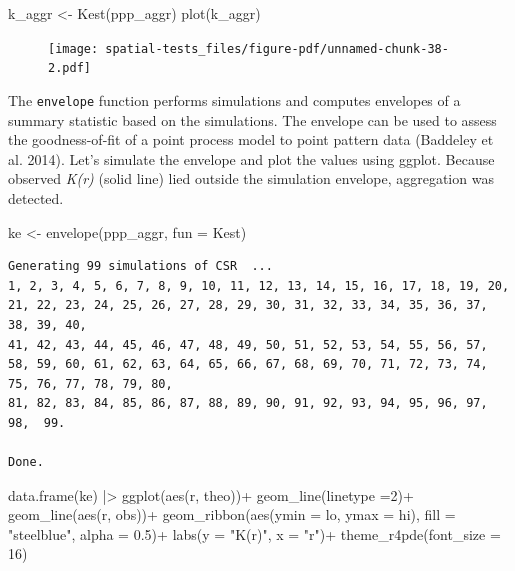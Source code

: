 \documentclass[
  letterpaper,
]{book}
\newenvironment{Shaded}{\begin{snugshade}}{\end{snugshade}}
\newcommand{\AttributeTok}[1]{\textcolor[rgb]{0.40,0.45,0.13}{#1}}
\newcommand{\DecValTok}[1]{\textcolor[rgb]{0.68,0.00,0.00}{#1}}
\newcommand{\FloatTok}[1]{\textcolor[rgb]{0.68,0.00,0.00}{#1}}
\newcommand{\FunctionTok}[1]{\textcolor[rgb]{0.28,0.35,0.67}{#1}}
\newcommand{\NormalTok}[1]{\textcolor[rgb]{0.00,0.23,0.31}{#1}}
\newcommand{\OtherTok}[1]{\textcolor[rgb]{0.00,0.23,0.31}{#1}}
\newcommand{\SpecialCharTok}[1]{\textcolor[rgb]{0.37,0.37,0.37}{#1}}
\newcommand{\StringTok}[1]{\textcolor[rgb]{0.13,0.47,0.30}{#1}}
\begin{document}
\begin{Shaded}
\begin{Highlighting}[]
\NormalTok{k\_aggr }\OtherTok{\textless{}{-}} \FunctionTok{Kest}\NormalTok{(ppp\_aggr)}
\FunctionTok{plot}\NormalTok{(k\_aggr)}
\end{Highlighting}
\end{Shaded}

\begin{figure}[H]

\texttt{[image: spatial-tests\_files/figure-pdf/unnamed-chunk-38-2.pdf]} \hfill{}

\end{figure}

The \texttt{envelope} function performs simulations and computes
envelopes of a summary statistic based on the simulations. The envelope
can be used to assess the goodness-of-fit of a point process model to
point pattern data (Baddeley et al. 2014). Let's simulate the envelope
and plot the values using ggplot. Because observed \emph{K(r)} (solid
line) lied outside the simulation envelope, aggregation was detected.

\begin{Shaded}
\begin{Highlighting}[]
\NormalTok{ke }\OtherTok{\textless{}{-}} \FunctionTok{envelope}\NormalTok{(ppp\_aggr, }\AttributeTok{fun =}\NormalTok{ Kest)}
\end{Highlighting}
\end{Shaded}

\begin{verbatim}
Generating 99 simulations of CSR  ...
1, 2, 3, 4, 5, 6, 7, 8, 9, 10, 11, 12, 13, 14, 15, 16, 17, 18, 19, 20, 21, 22, 23, 24, 25, 26, 27, 28, 29, 30, 31, 32, 33, 34, 35, 36, 37, 38, 39, 40,
41, 42, 43, 44, 45, 46, 47, 48, 49, 50, 51, 52, 53, 54, 55, 56, 57, 58, 59, 60, 61, 62, 63, 64, 65, 66, 67, 68, 69, 70, 71, 72, 73, 74, 75, 76, 77, 78, 79, 80,
81, 82, 83, 84, 85, 86, 87, 88, 89, 90, 91, 92, 93, 94, 95, 96, 97, 98,  99.

Done.
\end{verbatim}

\begin{Shaded}
\begin{Highlighting}[]
\FunctionTok{data.frame}\NormalTok{(ke) }\SpecialCharTok{|\textgreater{}} 
  \FunctionTok{ggplot}\NormalTok{(}\FunctionTok{aes}\NormalTok{(r, theo))}\SpecialCharTok{+}
  \FunctionTok{geom\_line}\NormalTok{(}\AttributeTok{linetype =}\DecValTok{2}\NormalTok{)}\SpecialCharTok{+}
  \FunctionTok{geom\_line}\NormalTok{(}\FunctionTok{aes}\NormalTok{(r, obs))}\SpecialCharTok{+}
  \FunctionTok{geom\_ribbon}\NormalTok{(}\FunctionTok{aes}\NormalTok{(}\AttributeTok{ymin =}\NormalTok{ lo, }\AttributeTok{ymax =}\NormalTok{ hi),}
              \AttributeTok{fill =} \StringTok{"steelblue"}\NormalTok{, }\AttributeTok{alpha =} \FloatTok{0.5}\NormalTok{)}\SpecialCharTok{+}
  \FunctionTok{labs}\NormalTok{(}\AttributeTok{y =} \StringTok{"K(r)"}\NormalTok{, }\AttributeTok{x =} \StringTok{"r"}\NormalTok{)}\SpecialCharTok{+}
  \FunctionTok{theme\_r4pde}\NormalTok{(}\AttributeTok{font\_size =} \DecValTok{16}\NormalTok{)}
\end{Highlighting}
\end{Shaded}
\end{document}
